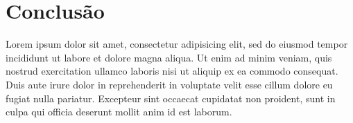 \chapter{Conclusão} %
\label{cha:conclusao}
	Lorem ipsum dolor sit amet, consectetur adipisicing elit, sed do eiusmod
	tempor incididunt ut labore et dolore magna aliqua. Ut enim ad minim veniam,
	quis nostrud exercitation ullamco laboris nisi ut aliquip ex ea commodo
	consequat. Duis aute irure dolor in reprehenderit in voluptate velit esse
	cillum dolore eu fugiat nulla pariatur. Excepteur sint occaecat cupidatat non
	proident, sunt in culpa qui officia deserunt mollit anim id est laborum.
